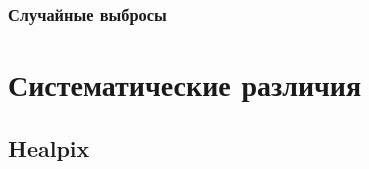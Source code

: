 \documentclass[14pt,aspectratio=43]{beamer}
\begin{document}
\begin{frame}[<alignment>]
\frametitle{Случайные выбросы}


\begin{figure}[h!]
\label{img:75maxlonlat}
\end{figure}

\end{frame}	


\section{Систематические различия}\label{sistem}
\subsection{Healpix}\label{sub:smthhealpix}
\begin{frame}[<alignment>]


\begin{figure}[h!]
\label{img:healpix}
\end{figure}

\end{frame}	
\end{document}
